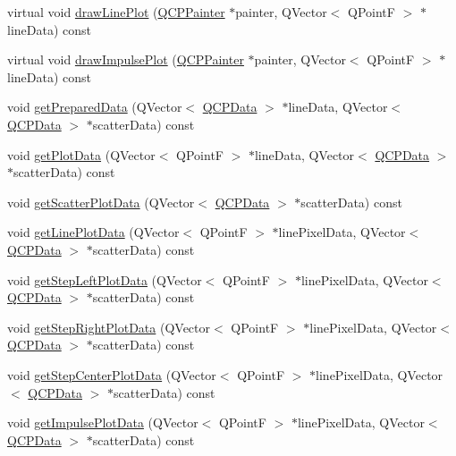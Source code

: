 \begin{DoxyCompactItemize}
\item 
virtual void \hyperlink{class_q_c_p_graph_acebc22c3385829b19a87e6281fe6ade2}{draw\+Line\+Plot} (\hyperlink{class_q_c_p_painter}{Q\+C\+P\+Painter} $\ast$painter, Q\+Vector$<$ Q\+Point\+F $>$ $\ast$line\+Data) const 
\item 
virtual void \hyperlink{class_q_c_p_graph_abc01180629621f1e47e94559227d3d8c}{draw\+Impulse\+Plot} (\hyperlink{class_q_c_p_painter}{Q\+C\+P\+Painter} $\ast$painter, Q\+Vector$<$ Q\+Point\+F $>$ $\ast$line\+Data) const 
\item 
void \hyperlink{class_q_c_p_graph_ab420b46ba638dc3252439fe16687b244}{get\+Prepared\+Data} (Q\+Vector$<$ \hyperlink{class_q_c_p_data}{Q\+C\+P\+Data} $>$ $\ast$line\+Data, Q\+Vector$<$ \hyperlink{class_q_c_p_data}{Q\+C\+P\+Data} $>$ $\ast$scatter\+Data) const 
\item 
void \hyperlink{class_q_c_p_graph_a466c661e015188971c862031af946693}{get\+Plot\+Data} (Q\+Vector$<$ Q\+Point\+F $>$ $\ast$line\+Data, Q\+Vector$<$ \hyperlink{class_q_c_p_data}{Q\+C\+P\+Data} $>$ $\ast$scatter\+Data) const 
\item 
void \hyperlink{class_q_c_p_graph_a45c4214b59ea11aa6d8d112bdc3b0e03}{get\+Scatter\+Plot\+Data} (Q\+Vector$<$ \hyperlink{class_q_c_p_data}{Q\+C\+P\+Data} $>$ $\ast$scatter\+Data) const 
\item 
void \hyperlink{class_q_c_p_graph_ae3d82ffd0c9a883482aabf47b0e6b5ee}{get\+Line\+Plot\+Data} (Q\+Vector$<$ Q\+Point\+F $>$ $\ast$line\+Pixel\+Data, Q\+Vector$<$ \hyperlink{class_q_c_p_data}{Q\+C\+P\+Data} $>$ $\ast$scatter\+Data) const 
\item 
void \hyperlink{class_q_c_p_graph_a609cf4a78045b4d2a679bdff7623847e}{get\+Step\+Left\+Plot\+Data} (Q\+Vector$<$ Q\+Point\+F $>$ $\ast$line\+Pixel\+Data, Q\+Vector$<$ \hyperlink{class_q_c_p_data}{Q\+C\+P\+Data} $>$ $\ast$scatter\+Data) const 
\item 
void \hyperlink{class_q_c_p_graph_a3b9b8c8dc7a6fd9be6e253c25ee31809}{get\+Step\+Right\+Plot\+Data} (Q\+Vector$<$ Q\+Point\+F $>$ $\ast$line\+Pixel\+Data, Q\+Vector$<$ \hyperlink{class_q_c_p_data}{Q\+C\+P\+Data} $>$ $\ast$scatter\+Data) const 
\item 
void \hyperlink{class_q_c_p_graph_ad3713e7d8eb85a0afc34a81a5db5cd27}{get\+Step\+Center\+Plot\+Data} (Q\+Vector$<$ Q\+Point\+F $>$ $\ast$line\+Pixel\+Data, Q\+Vector$<$ \hyperlink{class_q_c_p_data}{Q\+C\+P\+Data} $>$ $\ast$scatter\+Data) const 
\item 
void \hyperlink{class_q_c_p_graph_a1ca2b0762505767f116892609fb02062}{get\+Impulse\+Plot\+Data} (Q\+Vector$<$ Q\+Point\+F $>$ $\ast$line\+Pixel\+Data, Q\+Vector$<$ \hyperlink{class_q_c_p_data}{Q\+C\+P\+Data} $>$ $\ast$scatter\+Data) const 

\end{DoxyCompactItemize}
